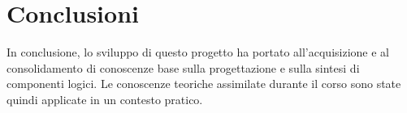 \documentclass[11pt]{article}
\begin{document}
\section{Conclusioni}

        In conclusione, lo sviluppo di questo progetto ha portato all'acquisizione e al consolidamento di conoscenze base sulla progettazione e sulla sintesi di componenti logici.
        Le conoscenze teoriche assimilate durante il corso sono state quindi applicate in un contesto pratico.
      
\end{document}
